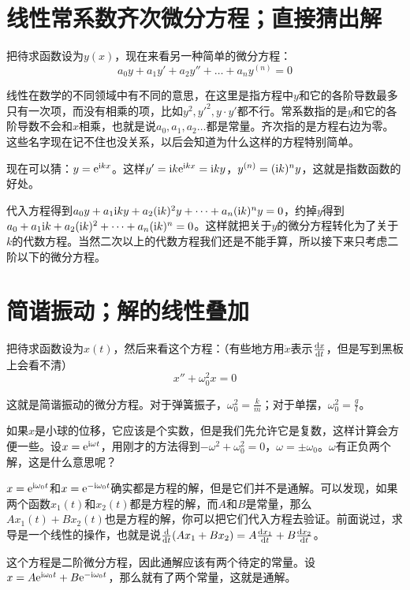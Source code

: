 \section{线性常系数齐次微分方程；直接猜出解}
把待求函数设为$y(x)$，现在来看另一种简单的微分方程：
\begin{equation*}
a_0 y+a_1 y'+a_2 y''+\dots+a_n y^{(n)}=0
\end{equation*}

线性在数学的不同领域中有不同的意思，在这里是指方程中$y$和它的各阶导数最多只有一次项，而没有相乘的项，比如$y^2,y'^2,y \cdot y'$都不行。常系数指的是$y$和它的各阶导数不会和$x$相乘，也就是说$a_0,a_1,a_2\dots$都是常量。齐次指的是方程右边为零。这些名字现在记不住也没关系，以后会知道为什么这样的方程特别简单。

现在可以猜：$y=\mathrm{e}^{\mathrm{i} k x}$。这样$y'=\mathrm{i} k \mathrm{e}^{\mathrm{i} k x}=\mathrm{i} k y$，$y^{(n)}=(\mathrm{i} k)^n y$，这就是指数函数的好处。

代入方程得到$a_0 y+a_1 \mathrm{i} k y+a_2 (\mathrm{i} k)^2 y+\dots+a_n (\mathrm{i} k)^n y=0$，约掉$y$得到$a_0+a_1 \mathrm{i} k+a_2 (\mathrm{i} k)^2+\dots+a_n (\mathrm{i} k)^n=0$。这样就把关于$y$的微分方程转化为了关于$k$的代数方程。当然二次以上的代数方程我们还是不能手算，所以接下来只考虑二阶以下的微分方程。
\section{简谐振动；解的线性叠加}
把待求函数设为$x(t)$，然后来看这个方程：（有些地方用$\dot x$表示$\frac{\mathop{}\!\mathrm{d} x}{\mathop{}\!\mathrm{d} t}$，但是写到黑板上会看不清）
\begin{equation*}
x''+\omega_0^2 x=0
\end{equation*}

这就是简谐振动的微分方程。对于弹簧振子，$\omega_0^2=\frac{k}{m}$；对于单摆，$\omega_0^2=\frac{g}{l}$。

如果$x$是小球的位移，它应该是个实数，但是我们先允许它是复数，这样计算会方便一些。设$x=\mathrm{e}^{\mathrm{i} \omega t}$，用刚才的方法得到$-\omega^2+\omega_0^2=0$，$\omega=\pm \omega_0$。$\omega$有正负两个解，这是什么意思呢？

$x=\mathrm{e}^{\mathrm{i} \omega_0 t}$和$x=\mathrm{e}^{-\mathrm{i} \omega_0 t}$确实都是方程的解，但是它们并不是通解。可以发现，如果两个函数$x_1(t)$和$x_2(t)$都是方程的解，而$A$和$B$是常量，那么$A x_1(t)+B x_2(t)$也是方程的解，你可以把它们代入方程去验证。前面说过，求导是一个线性的操作，也就是说$\frac{\mathop{}\!\mathrm{d}}{\mathop{}\!\mathrm{d} t}(A x_1+B x_2)=A \frac{\mathop{}\!\mathrm{d} x_1}{\mathop{}\!\mathrm{d} t}+B \frac{\mathop{}\!\mathrm{d} x_2}{\mathop{}\!\mathrm{d} t}$。

这个方程是二阶微分方程，因此通解应该有两个待定的常量。设$x=A \mathrm{e}^{\mathrm{i} \omega_0 t}+B \mathrm{e}^{-\mathrm{i} \omega_0 t}$，那么就有了两个常量，这就是通解。

